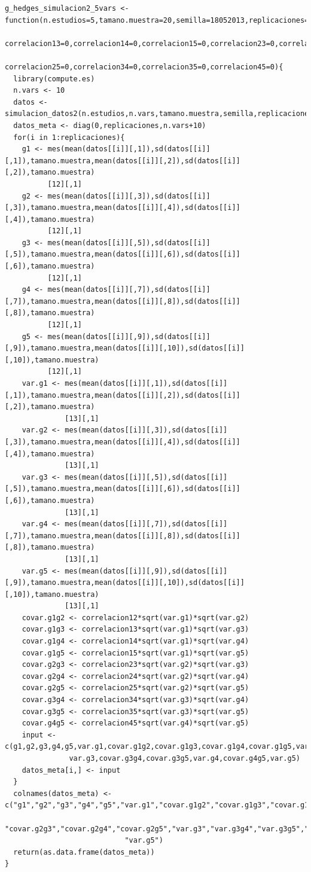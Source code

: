 \documentclass[a4paper,openright,12pt]{report}
\begin{document}
{\begin{verbatim}
g_hedges_simulacion2_5vars <- function(n.estudios=5,tamano.muestra=20,semilla=18052013,replicaciones=5,correlacion12=0,
                                       correlacion13=0,correlacion14=0,correlacion15=0,correlacion23=0,correlacion24=0,
                                       correlacion25=0,correlacion34=0,correlacion35=0,correlacion45=0){
  library(compute.es)
  n.vars <- 10
  datos <- simulacion_datos2(n.estudios,n.vars,tamano.muestra,semilla,replicaciones) 
  datos_meta <- diag(0,replicaciones,n.vars+10)
  for(i in 1:replicaciones){
    g1 <- mes(mean(datos[[i]][,1]),sd(datos[[i]][,1]),tamano.muestra,mean(datos[[i]][,2]),sd(datos[[i]][,2]),tamano.muestra)
          [12][,1]
    g2 <- mes(mean(datos[[i]][,3]),sd(datos[[i]][,3]),tamano.muestra,mean(datos[[i]][,4]),sd(datos[[i]][,4]),tamano.muestra)
          [12][,1]
    g3 <- mes(mean(datos[[i]][,5]),sd(datos[[i]][,5]),tamano.muestra,mean(datos[[i]][,6]),sd(datos[[i]][,6]),tamano.muestra)
          [12][,1]
    g4 <- mes(mean(datos[[i]][,7]),sd(datos[[i]][,7]),tamano.muestra,mean(datos[[i]][,8]),sd(datos[[i]][,8]),tamano.muestra)
          [12][,1]
    g5 <- mes(mean(datos[[i]][,9]),sd(datos[[i]][,9]),tamano.muestra,mean(datos[[i]][,10]),sd(datos[[i]][,10]),tamano.muestra)
          [12][,1]
    var.g1 <- mes(mean(datos[[i]][,1]),sd(datos[[i]][,1]),tamano.muestra,mean(datos[[i]][,2]),sd(datos[[i]][,2]),tamano.muestra)
              [13][,1]
    var.g2 <- mes(mean(datos[[i]][,3]),sd(datos[[i]][,3]),tamano.muestra,mean(datos[[i]][,4]),sd(datos[[i]][,4]),tamano.muestra)
              [13][,1]
    var.g3 <- mes(mean(datos[[i]][,5]),sd(datos[[i]][,5]),tamano.muestra,mean(datos[[i]][,6]),sd(datos[[i]][,6]),tamano.muestra)
              [13][,1]
    var.g4 <- mes(mean(datos[[i]][,7]),sd(datos[[i]][,7]),tamano.muestra,mean(datos[[i]][,8]),sd(datos[[i]][,8]),tamano.muestra)
              [13][,1]
    var.g5 <- mes(mean(datos[[i]][,9]),sd(datos[[i]][,9]),tamano.muestra,mean(datos[[i]][,10]),sd(datos[[i]][,10]),tamano.muestra)
              [13][,1]
    covar.g1g2 <- correlacion12*sqrt(var.g1)*sqrt(var.g2)
    covar.g1g3 <- correlacion13*sqrt(var.g1)*sqrt(var.g3)
    covar.g1g4 <- correlacion14*sqrt(var.g1)*sqrt(var.g4)
    covar.g1g5 <- correlacion15*sqrt(var.g1)*sqrt(var.g5)
    covar.g2g3 <- correlacion23*sqrt(var.g2)*sqrt(var.g3)
    covar.g2g4 <- correlacion24*sqrt(var.g2)*sqrt(var.g4)
    covar.g2g5 <- correlacion25*sqrt(var.g2)*sqrt(var.g5)
    covar.g3g4 <- correlacion34*sqrt(var.g3)*sqrt(var.g4)
    covar.g3g5 <- correlacion35*sqrt(var.g3)*sqrt(var.g5)
    covar.g4g5 <- correlacion45*sqrt(var.g4)*sqrt(var.g5)
    input <- c(g1,g2,g3,g4,g5,var.g1,covar.g1g2,covar.g1g3,covar.g1g4,covar.g1g5,var.g2,covar.g2g3,covar.g2g4,covar.g2g5,
               var.g3,covar.g3g4,covar.g3g5,var.g4,covar.g4g5,var.g5)
    datos_meta[i,] <- input
  }
  colnames(datos_meta) <- c("g1","g2","g3","g4","g5","var.g1","covar.g1g2","covar.g1g3","covar.g1g4","covar.g1g5","var.g2",
                            "covar.g2g3","covar.g2g4","covar.g2g5","var.g3","var.g3g4","var.g3g5","var.g4","covar.g4g5",
                            "var.g5")
  return(as.data.frame(datos_meta))
}


\end{verbatim}}
\end{document}
